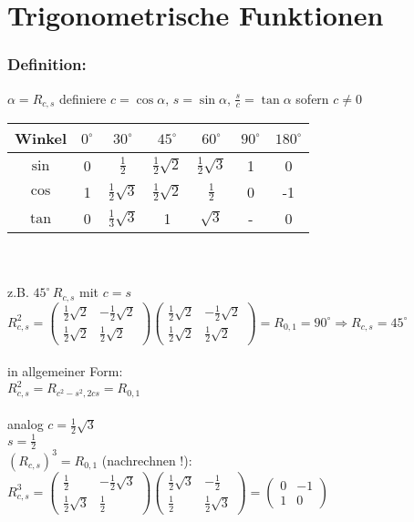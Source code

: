\section{Trigonometrische Funktionen}
%
%
%
\subsubsection{Definition:}
$\alpha = R_{c,s}$ definiere $c=\cos \alpha, \, s=\sin\alpha, \, \frac{s}{c}=\tan\alpha$  sofern $c \neq 0$
%
%
%
%
\qquad\\
 \begin{tabular}{|c|c|c|c|c|c|c|}
 \hline
Winkel & $0^{\circ}$ & $30^{\circ}$ & $45^{\circ}$ & $60^{\circ}$ & $90^{\circ}$ & $180^{\circ}$\\\hline
$\sin$ & 0 & $\frac{1}{2}$ & $\frac{1}{2}\sqrt{2}$ & $\frac{1}{2} \sqrt{3}$ & 1 & 0\\\hline
$\cos$ & 1 & $\frac{1}{2} \sqrt{3}$ &$\frac{1}{2}\sqrt{2}$ &  $\frac{1}{2}$  & 0 & -1\\\hline
$\tan$ & 0 &$\frac{1}{3}\sqrt{3}$ & 1 & $\sqrt{3}$ & - & 0 \\\hline
 \end{tabular}\\
 \qquad\\
 z.B. $45^{\circ} \, R_{c,s}$ mit $c=s$ \\
$R^{2}_{c,s} = \begin{pmatrix} \frac{1}{2}\sqrt{2} & - \frac{1}{2}\sqrt{2} \\ \frac{1}{2}\sqrt{2} & \frac{1}{2}\sqrt{2} \end{pmatrix}\begin{pmatrix} \frac{1}{2}\sqrt{2} & - \frac{1}{2}\sqrt{2} \\ \frac{1}{2}\sqrt{2} & \frac{1}{2}\sqrt{2} \end{pmatrix} = R_{0,1}= 90^{\circ} \Rightarrow R_{c,s} = 45^{\circ}$ \\
\qquad\\
 in allgemeiner Form:\\
 $ R^{2}_{c,s} = R_{c^{2}-s^{2},2cs}=R_{0,1}$\\
 \qquad\\
 analog $ c= \frac{1}{2}\sqrt{3}$ \\
 $s=\frac{1}{2}$\\
 $(R_{c,s})^{3} = R_{0,1}$ (nachrechnen !): $R_{c,s}^{3} = \begin{pmatrix} \frac{1}{2} & -\frac{1}{2}\sqrt{3} \\ \frac{1}{2}\sqrt{3} & \frac{1}{2} \end{pmatrix}\begin{pmatrix} \frac{1}{2}\sqrt{3} & -\frac{1}{2} \\ \frac{1}{2} & \frac{1}{2}\sqrt{3} \end{pmatrix} = \begin{pmatrix} 0 & -1 \\ 1 & 0 \end{pmatrix}$
